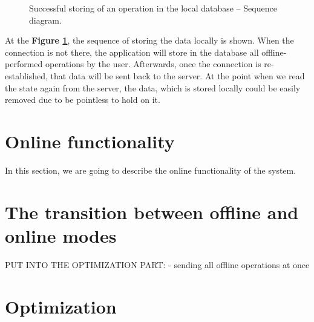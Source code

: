 \begin{figure}[!htb]
    \begin{center}
    \def\svgwidth{\columnwidth}
    
    \caption {Successful storing of an operation in the local database -- Sequence diagram.}
    \label{fig:design7}
\end{center}
\end{figure}

At the \textbf{Figure \ref{fig:design7}}, the sequence of storing the data locally is shown. When the connection is not there, the application will store in the database all offline-performed operations by the user. Afterwards, once the connection is re-established, that data will be sent back to the server. At the point when we read the state again from the server, the data, which is stored locally could be easily removed due to be pointless to hold on it. 


\section {Online functionality}

In this section, we are going to describe the online functionality of the system.



\section {The transition between offline and online modes}









PUT INTO THE OPTIMIZATION PART:
- sending all offline operations at once


\section{Optimization}